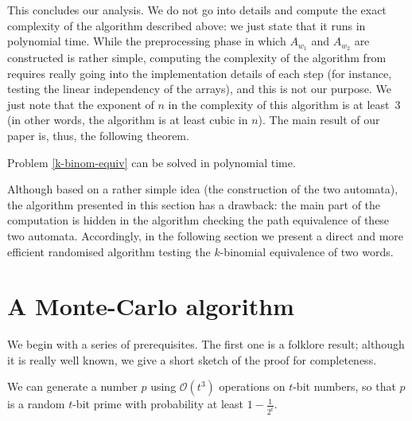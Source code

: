 \documentclass[runningheads]{llncs}
\newcommand{\bigo}{{\mathcal{O}}}
\begin{document}
This concludes our analysis. We do not go into details and compute the exact complexity of the algorithm described above: we just state that it runs in polynomial time. While the preprocessing phase in which $A_{w_1}$ and $A_{w_2}$ are constructed is rather simple, computing the complexity of the algorithm from \cite{siamNFA} requires really going into the implementation details of each step (for instance, testing the linear independency of the arrays), and this is not our purpose. We just note that the exponent of $n$ in the complexity of this algorithm is at least~$3$ (in other words, the algorithm is at least cubic in $n$). The main result of our paper is, thus, the following theorem. 
\begin{theorem}Problem \ref{k-binom-equiv} can be solved in polynomial time.
\end{theorem}

Although based on a rather simple idea (the construction of the two automata), the algorithm presented in this section has a drawback: the main part of the computation is hidden in the algorithm checking the path equivalence of these two automata. Accordingly, in the following section we present a direct and more efficient randomised algorithm testing the $k$-binomial equivalence of two words.

\section{A Monte-Carlo algorithm}

We begin with a series of prerequisites. The first one is a folklore result; although it is really well known, 
we give a short sketch of the proof for completeness.
\begin{lemma}\label{prime}
We can generate a number $p$ using $\bigo(t^{3})$ operations on $t$-bit numbers, so that $p$ is a random $t$-bit prime with probability at least $1-\frac{1}{2^{t}}$.
\end{lemma}
\end{document}

